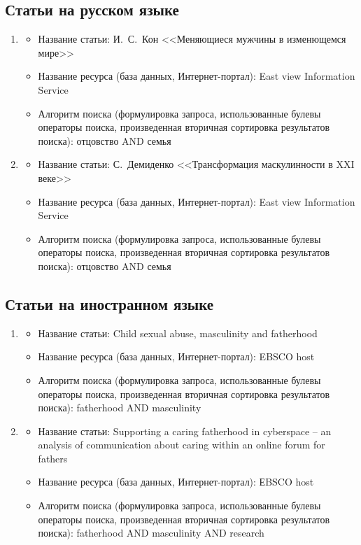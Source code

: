 \documentclass{../../common/thesisbyxetex}
\begin{document}
\subsection*{Статьи на русском языке}
\begin{enumerate}
 \item
 \begin{itemize}
   \item Название статьи: И.~С.~Кон <<Меняющиеся мужчины в изменющемся мире>>
   \item Название ресурса (база данных, Интернет-портал): East view Information Service
   \item Алгоритм поиска (формулировка запроса, использованные булевы операторы поиска, произведенная вторичная
сортировка результатов поиска): отцовство AND  семья
 \end{itemize}
 \item
    \begin{itemize}
     \item Название статьи:   С.~Демиденко <<Трансформация маскулинности в XXI веке>>
     \item Название ресурса (база данных, Интернет-портал): East view Information Service
     \item Алгоритм поиска (формулировка запроса, использованные булевы операторы поиска, произведенная вторичная
сортировка результатов поиска): отцовство AND  семья
    \end{itemize}
\end{enumerate}

\subsection*{Статьи на иностранном языке}
\begin{enumerate}
 \item
 \begin{itemize}
   \item Название статьи: Child sexual abuse, masculinity and fatherhood
   \item Название ресурса (база данных, Интернет-портал): EBSCO host
   \item Алгоритм поиска (формулировка запроса, использованные булевы операторы поиска, произведенная вторичная
сортировка результатов поиска): fatherhood AND  masculinity
 \end{itemize}
 \item
    \begin{itemize}
     \item Название статьи: Supporting a caring fatherhood in cyberspace – an analysis of communication about caring
within an online forum for fathers
     \item Название ресурса (база данных, Интернет-портал): ЕBSCO host
     \item Алгоритм поиска (формулировка запроса, использованные булевы операторы поиска, произведенная вторичная
сортировка результатов поиска): fatherhood  AND  masculinity AND research
    \end{itemize}
\end{enumerate}
\end{document}
